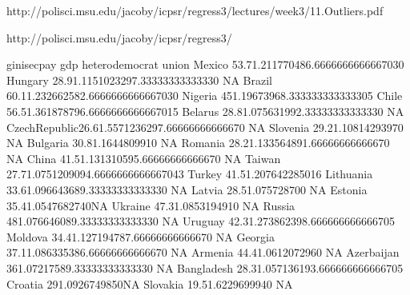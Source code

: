 http://polisci.msu.edu/jacoby/icpsr/regress3/lectures/week3/11.Outliers.pdf

http://polisci.msu.edu/jacoby/icpsr/regress3/

ginisecpay  gdp  heterodemocrat    union
 Mexico       53.71.211770486.6666666666667030
 Hungary      28.91.1151023297.33333333333330 NA
 Brazil       60.11.232662582.6666666666667030
 Nigeria      451.19673968.333333333333305
 Chile        56.51.361878796.6666666666667015
 Belarus      28.81.075631992.33333333333330 NA
 CzechRepublic26.61.5571236297.66666666666670 NA
 Slovenia     29.21.10814293970 NA
 Bulgaria     30.81.1644809910 NA
 Romania      28.21.133564891.66666666666670 NA
 China        41.51.131310595.66666666666670 NA
 Taiwan       27.71.0751209094.6666666666667043
 Turkey       41.51.207642285016
 Lithuania    33.61.096643689.33333333333330 NA
 Latvia       28.51.075728700 NA
 Estonia      35.41.0547682740NA 
 Ukraine      47.31.0853194910 NA
 Russia       481.076646089.33333333333330 NA
 Uruguay      42.31.273862398.666666666666705
 Moldova      34.41.127194787.66666666666670 NA
 Georgia      37.11.086335386.66666666666670 NA
 Armenia      44.41.0612072960 NA
 Azerbaijan   361.07217589.33333333333330 NA
 Bangladesh   28.31.057136193.666666666666705
 Croatia      291.0926749850NA 
 Slovakia     19.51.6229699940 NA

